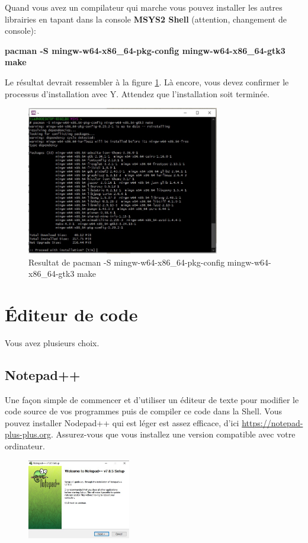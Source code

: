 \documentclass{article}
\begin{document}
Quand vous avez un compilateur qui marche vous pouvez installer les autres librairies en tapant dans la console {\color{Purple}\textbf{MSYS2 Shell}} (attention, changement de console):
\begin{tcolorbox}[width=\textwidth,colframe=Purple,colback={black},title={Ceci est la console MSYS2 Shell},outer arc=0mm,colupper=white]    
      \large\textbf{pacman -S mingw-w64-x86\_64-pkg-config mingw-w64-x86\_64-gtk3 make}
\end{tcolorbox}
Le résultat devrait ressembler à la figure \ref{F:gtkInstal}. Là encore, vous devez confirmer le processus d'installation avec Y. Attendez que l'installation soit terminée.
\begin{figure}[H]
\center
\includegraphics[width=0.75\textwidth]{Plots/Msys2_14pkg.jpg}
\caption{Resultat de pacman -S mingw-w64-x86\_64-pkg-config mingw-w64-x86\_64-gtk3 make\label{F:gtkInstal}}
\end{figure}

\section{Éditeur de code\label{S:Editor}}
Vous avez plusieurs choix.
\subsection{Notepad++}
Une façon simple de commencer et d’utiliser un éditeur de texte pour modifier le code source de vos programmes puis de compiler ce code dans la Shell. Vous pouvez installer Nodepad++ qui est léger est assez efficace, d'ici \href{https://notepad-plus-plus.org}{https://notepad-plus-plus.org}. Assurez-vous que vous installez une version compatible avec votre ordinateur.
\begin{figure}[H]
\center
\includegraphics[width=0.4\textwidth]{Plots/Editor_1.jpg}
\end{figure}
\end{document}
